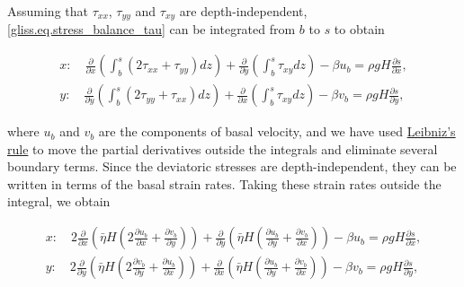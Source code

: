 {\noindent
Assuming that $\tau_{xx}$, $\tau_{yy}$ and $\tau_{xy}$ are depth-independent,
\eqref{gliss.eq.stress_balance_tau} can be integrated from $b$ to $s$ to obtain

\begin{equation}
  \label{gliss.eq.stress_balance_tau_integrated}
  \begin{split}
    x: \quad \frac{\partial }{\partial x} \left( \int_b^s (2 \tau_{xx} + \tau_{yy}) dz \right)
           + \frac{\partial }{\partial y} \left( \int_b^s {\tau_{xy} dz} \right)
           - \beta u_b = \rho g H \frac{\partial s}{\partial x}, \\
    y: \quad \frac{\partial }{\partial y} \left( \int_b^s (2 \tau_{yy} + \tau_{xx}) dz \right)
           + \frac{\partial }{\partial x} \left( \int_b^s {\tau_{xy} dz} \right)
           - \beta v_b = \rho g H \frac{\partial s}{\partial y},
  \end{split}
\end{equation}

\noindent
where $u_b$ and $v_b$ are the components of basal velocity, and we have used
\href{http://en.wikipedia.org/wiki/Leibniz_integral_rule}{Leibniz's rule}
to move the partial derivatives outside the integrals and eliminate several boundary terms.
Since the deviatoric stresses are depth-independent, they can be written in terms of the
basal strain rates. Taking these strain rates outside the integral, we obtain

\begin{equation}
  \label{gliss.eq.stress_balance_tau_integrated2}
  \begin{split}
    x: \quad 2 \frac{\partial }{\partial x} \left( \bar{\eta}H \left( 2 \frac{\partial u_b}{\partial x} + \frac{\partial v_b}{\partial y} \right) \right)
             + \frac{\partial }{\partial y} \left( \bar{\eta}H \left(   \frac{\partial u_b}{\partial y} + \frac{\partial v_b}{\partial x} \right) \right)
             - \beta u_b = \rho g H \frac{\partial s}{\partial x}, \\
    y: \quad 2 \frac{\partial }{\partial y} \left( \bar{\eta}H \left( 2 \frac{\partial v_b}{\partial y} + \frac{\partial u_b}{\partial x} \right) \right)
             + \frac{\partial }{\partial x} \left( \bar{\eta}H \left(   \frac{\partial u_b}{\partial y} + \frac{\partial v_b}{\partial x} \right) \right)
             - \beta v_b = \rho g H \frac{\partial s}{\partial y}, \\
  \end{split}
\end{equation}

}

